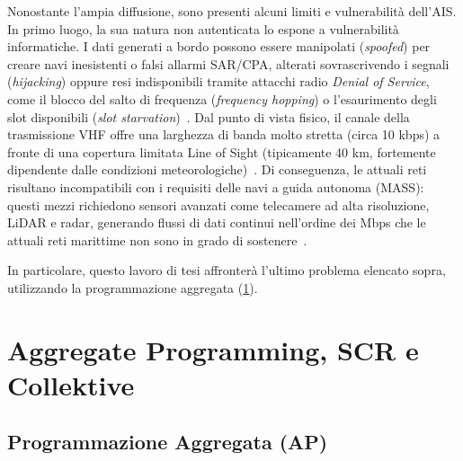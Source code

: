 Nonostante l'ampia diffusione, sono presenti alcuni limiti e vulnerabilità dell'\ac{AIS}. In primo luogo, la sua natura non autenticata lo espone a vulnerabilità informatiche. I dati generati a bordo possono essere manipolati (\emph{spoofed}) per creare navi inesistenti o falsi allarmi \ac{SAR}/\ac{CPA}, alterati sovrascrivendo i segnali (\emph{hijacking}) oppure resi indisponibili tramite attacchi radio \emph{Denial of Service}, come il blocco del salto di frequenza (\emph{frequency hopping}) o l'esaurimento degli slot disponibili (\emph{slot starvation})~\cite{10.1145/2664243.2664257}. Dal punto di vista fisico, il canale della trasmissione \ac{VHF} offre una larghezza di banda molto stretta (circa 10 kbps) a fronte di una copertura limitata Line of Sight (tipicamente 40 km, fortemente dipendente dalle condizioni meteorologiche)~\cite{11217861}. Di conseguenza, le attuali reti risultano incompatibili con i requisiti delle navi a guida autonoma (\ac{MASS}): questi mezzi richiedono sensori avanzati come telecamere ad alta risoluzione, \ac{LiDAR} e radar, generando flussi di dati continui nell'ordine dei Mbps che le attuali reti marittime non sono in grado di sostenere~\cite{11217861}.

In particolare, questo lavoro di tesi affronterà l'ultimo problema elencato sopra, utilizzando la programmazione aggregata (\cref{sec:programmazione_aggregata_scr_collektive}).

\section{Aggregate Programming, SCR e Collektive}
\label{sec:programmazione_aggregata_scr_collektive}

\subsection{Programmazione Aggregata (AP)}
\label{sec:programmazione_aggregata}

